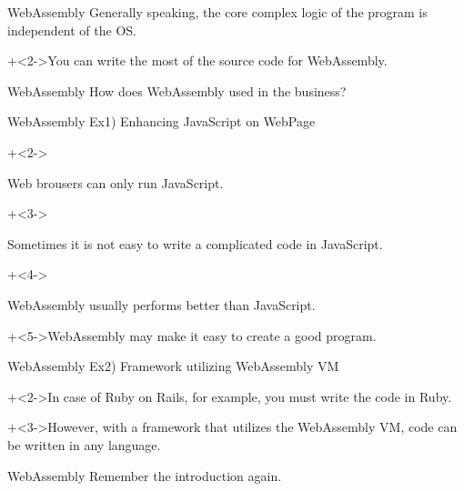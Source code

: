\begin{frame}{WebAssembly}{}
    Generally speaking, the core complex logic of the program is independent of the OS.
    \vspace{4ex}

    \onslide+<2->{You can write the most of the source code for WebAssembly.}
\end{frame}


\begin{frame}{WebAssembly}{}
    {\Large How does WebAssembly used in the business?}
\end{frame}


\begin{frame}{WebAssembly}{}
    Ex1) Enhancing JavaScript on WebPage
    \vspace{4ex}

    \begin{itemize}
        \onslide+<2->{\item Web brousers can only run JavaScript.}
        \onslide+<3->{\item Sometimes it is not easy to write a complicated code in JavaScript.}
        \onslide+<4->{\item WebAssembly usually performs better than JavaScript.}
    \end{itemize}
    \vspace{4ex}

    \onslide+<5->{WebAssembly may make it easy to create a good program.}
\end{frame}


\begin{frame}{WebAssembly}{}
    Ex2) Framework utilizing WebAssembly VM
    \vspace{4ex}

    \onslide+<2->{In case of Ruby on Rails, for example, you must write the code in Ruby.}
    \vspace{4ex}

    \onslide+<3->{However, with a framework that utilizes the WebAssembly VM, code can be written in any language.}
\end{frame}


\begin{frame}{WebAssembly}{}
    Remember the introduction again.
\end{frame}


